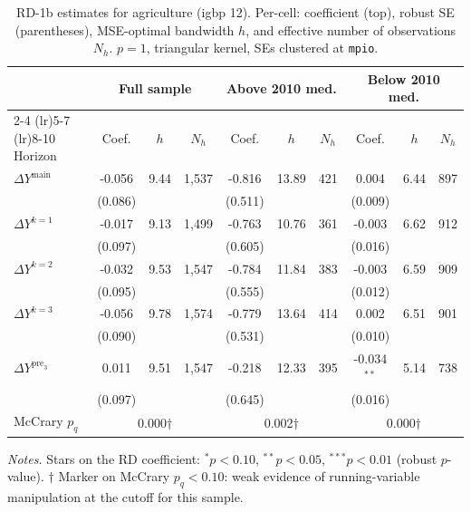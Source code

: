 \documentclass[11pt]{article}
\begin{document}
\begin{table}[H]
\centering
\scriptsize
\caption{RD-1b estimates for agriculture (igbp 12). Per-cell: coefficient
(top), robust SE (parentheses), MSE-optimal bandwidth $h$, and
effective number of observations $N_h$. $p=1$, triangular kernel,
SEs clustered at \texttt{mpio}.}
\label{tab:rdplot_rd1b_agriculture}
\begin{tabular}{l ccc ccc ccc}
\toprule
 & \multicolumn{3}{c}{Full sample} & \multicolumn{3}{c}{Above 2010 med.} & \multicolumn{3}{c}{Below 2010 med.} \\
\cmidrule(lr){2-4} \cmidrule(lr){5-7} \cmidrule(lr){8-10}
Horizon & Coef. & $h$ & $N_h$ & Coef. & $h$ & $N_h$ & Coef. & $h$ & $N_h$ \\
\midrule
$\Delta Y^{\text{main}}$ & -0.056 & 9.44 & 1,537 & -0.816 & 13.89 & 421 & 0.004 & 6.44 & 897 \\
 & (0.086) &  &  & (0.511) &  &  & (0.009) &  &  \\
\addlinespace[1pt]
$\Delta Y^{k=1}$ & -0.017 & 9.13 & 1,499 & -0.763 & 10.76 & 361 & -0.003 & 6.62 & 912 \\
 & (0.097) &  &  & (0.605) &  &  & (0.016) &  &  \\
\addlinespace[1pt]
$\Delta Y^{k=2}$ & -0.032 & 9.53 & 1,547 & -0.784 & 11.84 & 383 & -0.003 & 6.59 & 909 \\
 & (0.095) &  &  & (0.555) &  &  & (0.012) &  &  \\
\addlinespace[1pt]
$\Delta Y^{k=3}$ & -0.056 & 9.78 & 1,574 & -0.779 & 13.64 & 414 & 0.002 & 6.51 & 901 \\
 & (0.090) &  &  & (0.531) &  &  & (0.010) &  &  \\
\addlinespace[1pt]
$\Delta Y^{\text{pre}_3}$ & 0.011 & 9.51 & 1,547 & -0.218 & 12.33 & 395 & -0.034$^{**}$ & 5.14 & 738 \\
 & (0.097) &  &  & (0.645) &  &  & (0.016) &  &  \\
\addlinespace[1pt]
\midrule
McCrary $p_q$ & \multicolumn{3}{c}{0.000$\dagger$} & \multicolumn{3}{c}{0.002$\dagger$} & \multicolumn{3}{c}{0.000$\dagger$} \\
\bottomrule
\end{tabular}
\begin{flushleft}\footnotesize
\textit{Notes.} Stars on the RD coefficient: $^{*}p<0.10$,
$^{**}p<0.05$, $^{***}p<0.01$ (robust $p$-value).
$\dagger$ Marker on McCrary $p_q<0.10$: weak evidence of running-variable manipulation at the cutoff for this sample.\\
\end{flushleft}
\end{table}
\end{document}
